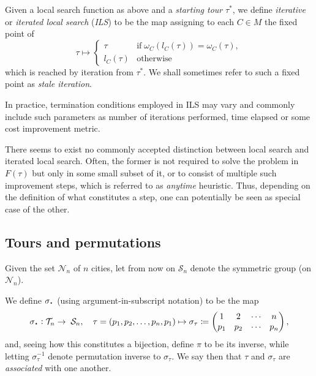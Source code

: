 \documentclass[index=totoc,bibliography=totoc]{scrartcl}
\newcommand*{\Cdot}{\raisebox{-0.30ex}{\scalebox{1.5}{$\cdot$}}}
\numberwithin{equation}{section}
\numberwithin{figure}{section}
\numberwithin{table}{section}
\let\defstyle\itshape
\begin{document}
\begin{define}[ILS]
\label{def:ils}
  Given a local search function as above and a {\defstyle starting tour}
  $\tau^\ast$, we define {\defstyle iterative} or {\defstyle iterated local search}
  ({\defstyle ILS}) to be the map assigning to each $C \in M$ the
  fixed point of
  \[
    \tau \mapsto
    \begin{cases}
      \tau \quad & \text{if} \;
      \omega_C\left(l_C\left(\tau\right)\right) = \omega_C\left(\tau\right),
      \\
      l_C\left(\tau\right) & \text{otherwise}
    \end{cases}
  \]
  which is reached by iteration from $\tau^\ast$.
  We shall sometimes refer to such a fixed point as {\defstyle stale iteration}.
\end{define}

In practice, termination conditions employed in ILS may vary and commonly
include such parameters as number of iterations performed, time elapsed
or some cost improvement metric.

\begin{remark}
  There seems to exist no commonly accepted distinction between local
  search and iterated local search.  Often, the former is not required to
  solve the problem in $F\left(\tau\right)$ but only in some small subset
  of it, or to consist of multiple such improvement steps, which is
  referred to as {\defstyle anytime} heuristic.  Thus, depending on the
  definition of what constitutes a step, one can potentially be seen as
  special case of the other.
\end{remark}

\subsection{Tours and permutations}

Given the set $\mathcal{N}_n$ of $n$ cities, let from now on
$\mathcal{S}_n$ denote the symmetric group (on $\mathcal{N}_n$).

\begin{define}
  We define $\sigma_{\Cdot}$ (using argument-in-subscript notation) to be the map
  \[
      \sigma_{\Cdot} :
      \mathcal{T}_n \to \; \mathcal{S}_n, \quad
      \tau = \left(p_1, p_2, \ldots, p_n, p_1 \right)
      \mapsto
    \sigma_\tau \coloneqq
    \begin{pmatrix}
      1 & 2 & \cdots & n \\
      p_1 & p_2 & \cdots &  p_n
    \end{pmatrix},
  \]
  and, seeing how this constitutes a bijection, define $\pi$ to be its inverse,
  while letting $\sigma_\tau^{-1}$ denote permutation inverse to $\sigma_\tau$.
  We say then that $\tau$ and $\sigma_\tau$ are {\defstyle associated} with one another.
\end{define}
\end{document}
